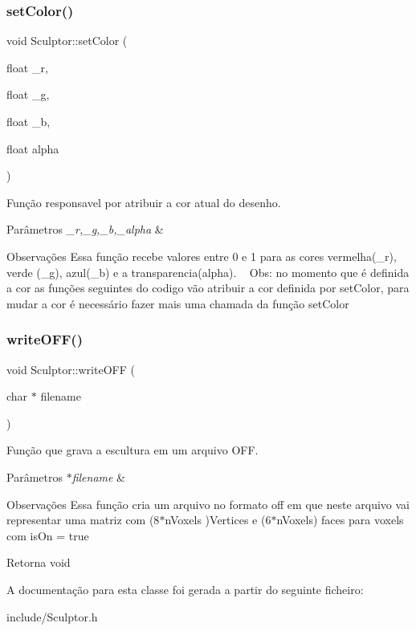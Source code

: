 \subsubsection{\texorpdfstring{set\+Color()}{setColor()}}
{\footnotesize\ttfamily void Sculptor\+::set\+Color (\begin{DoxyParamCaption}\item[{float}]{\+\_\+r,  }\item[{float}]{\+\_\+g,  }\item[{float}]{\+\_\+b,  }\item[{float}]{alpha }\end{DoxyParamCaption})}



Função responsavel por atribuir a cor atual do desenho. 


\begin{DoxyParams}{Parâmetros}
{\em \+\_\+r,\+\_\+g,\+\_\+b,\+\_\+alpha} & \\
\hline
\end{DoxyParams}
\begin{DoxyRemark}{Observações}
Essa função recebe valores entre 0 e 1 para as cores vermelha(\+\_\+r), verde (\+\_\+g), azul(\+\_\+b) e a transparencia(alpha). ~\newline
Obs\+: no momento que é definida a cor as funções seguintes do codigo vão atribuir a cor definida por set\+Color, para mudar a cor é necessário fazer mais uma chamada da função set\+Color 
\end{DoxyRemark}
\mbox{\label{class_sculptor_aa8ed61fc7cae10c4d7a895330fe5e309}} 
\subsubsection{\texorpdfstring{write\+O\+F\+F()}{writeOFF()}}
{\footnotesize\ttfamily void Sculptor\+::write\+O\+FF (\begin{DoxyParamCaption}\item[{char $\ast$}]{filename }\end{DoxyParamCaption})}



Função que grava a escultura em um arquivo O\+FF. 


\begin{DoxyParams}{Parâmetros}
{\em $\ast$filename} & \\
\hline
\end{DoxyParams}
\begin{DoxyRemark}{Observações}
Essa função cria um arquivo no formato off em que neste arquivo vai representar uma matriz com (8$\ast$n\+Voxels )Vertices e (6$\ast$n\+Voxels) faces para voxels com is\+On = true 
\end{DoxyRemark}
\begin{DoxyReturn}{Retorna}
void 
\end{DoxyReturn}


A documentação para esta classe foi gerada a partir do seguinte ficheiro\+:\begin{DoxyCompactItemize}
\item 
include/Sculptor.\+h\end{DoxyCompactItemize}
